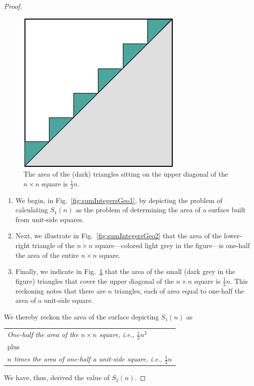 \begin{proof}
\begin{figure}[ht]
\begin{center}
       \includegraphics[scale=0.35]{FiguresMaths/SumIntegersGeometricFinal}
\caption{The area of the (dark) triangles sitting on the upper
  diagonal of the $n \times n$ square is $\frac{1}{2} n$.}
       \label{fig:sumIntegersGeo3}
\end{center}
\end{figure}
\begin{enumerate}
\item
We begin, in Fig.~\ref{fig:sumIntegersGeo1}, by depicting the problem of
calculating $S_1(n)$ as the problem of determining the area of a
surface built from unit-side squares.

\item
Next, we illustrate in Fig.~\ref{fig:sumIntegersGeo2} that the area of
the lower-right triangle of the $n \times n$ square---colored
light grey in the figure---is one-half the area of the entire $n \times n$
square.

\item
Finally, we indicate in Fig.~\ref{fig:sumIntegersGeo3} that the area
of the small (dark grey in the figure) triangles that cover the upper
diagonal of the $n \times n$ square is $\frac{1}{2} n$.  This
reckoning notes that there are $n$ triangles, each of area equal to
one-half the area of a unit-side square.
\end{enumerate}
We thereby reckon the area of the surface depicting $S_1(n)$ as

\begin{tabular}{l}
{\it One-half the area of the $n \times n$ square,
i.e., $\frac{1}{2} n^2$} \\
\hspace*{.15in} plus   \\
{\it $n$ times the area of one-half a unit-side square,
i.e., $\frac{1}{2} n$}
\end{tabular}

\smallskip

\noindent
We have, thus, derived the value of $S_1(n)$.
\end{proof}

